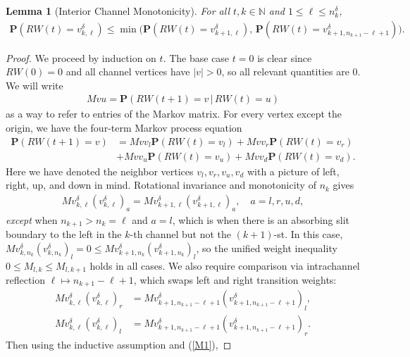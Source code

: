 \documentclass[11pt,reqno]{amsart}
\newtheorem{lem}[thm]{Lemma}
\numberwithin{equation}{section}
\begin{document}
\begin{lem}[Interior Channel Monotonicity] \label{lem_interior}
For all $t, k \in \mathbb{N}$ and $1 \le \ell \le n_k^{\delta}$,
\begin{align}\mathbf{P}(RW(t) = v^{\delta}_{k,\ell}) \le \min \bigl(\mathbf{P}(RW(t) = v^{\delta}_{k+1,\ell}) ,\, \mathbf{P}(RW(t) =  v^{\delta}_{k+1,n_{k+1}-\ell+1})\bigr).
\end{align}
\end{lem}
\begin{proof}
We proceed by induction on $t$. The base case $t=0$ is clear since $RW(0) = 0$ and all channel vertices have $|v| > 0$, so all relevant quantities are $0$. We will write
\begin{align}
Mvu = \mathbf{P}(RW(t+1) = v \, | \, RW(t) = u)
\end{align}
as a way to refer to entries of the Markov matrix.
For every vertex except the origin, we have the four-term Markov process equation
\begin{align}
\mathbf{P}(RW(t+1) = v) &= Mvv_l \mathbf{P}(RW(t) = v_l)
+ Mvv_r \mathbf{P}(RW(t) = v_r)\\
& + Mvv_u \mathbf{P}(RW(t) = v_u) + Mvv_d \mathbf{P}(RW(t) = v_d).
\end{align}
Here we have denoted the neighbor vertices $v_l, v_r, v_u, v_d$ with a picture of left, right, up, and down in mind. Rotational invariance and monotonicity of $n_k$ gives
\begin{align} \label{M1}
Mv^{\delta}_{k,\ell}(v^{\delta}_{k,\ell})_a = Mv^{\delta}_{k+1,\ell}(v^{\delta}_{k+1,\ell})_a, \quad a = l, r, u, d,
\end{align}
\textit{except} when $n_{k+1} > n_k = \ell$ and $a = l$, which is when there is an absorbing slit boundary to the left in the $k$-th channel but not the $(k+1)$-st. In this case, $Mv^{\delta}_{k,n_k}(v^{\delta}_{k,n_k})_l = 0 \le Mv^{\delta}_{k+1,n_k}(v^{\delta}_{k+1,n_k})_l$, so the unified weight inequality $0 \le M_{l,k} \le M_{l,k+1}$ holds in all cases.
We also require comparison via intrachannel reflection $\ell \mapsto n_{k+1} - \ell + 1$, which swaps left and right transition weights:
\begin{align}
Mv^{\delta}_{k,\ell}(v^{\delta}_{k,\ell})_r &= Mv^{\delta}_{k+1,n_{k+1}-\ell+1}(v^{\delta}_{k+1,n_{k+1}-\ell+1})_l,\\
Mv^{\delta}_{k,\ell}(v^{\delta}_{k,\ell})_l &= Mv^{\delta}_{k+1,n_{k+1}-\ell+1}(v^{\delta}_{k+1,n_{k+1}-\ell+1})_r.
\end{align}
Then using the inductive assumption and (\ref{M1}),

\end{proof}
\end{document}
